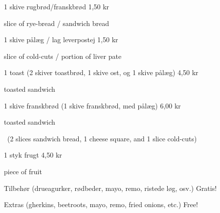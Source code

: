 \documentclass{article}
\begin{document}

\maketitle

\null
\vspace{-0.8cm}


\vspace{0.5cm}

1 skive rugbrød/franskbrød \hfill 1,50 kr

{ slice of rye-bread / sandwich bread}

\vspace{0.3cm}

1 skive pålæg / lag leverpostej \hfill 1,50 kr

{ slice of cold-cuts / portion of liver pate}

\vspace{0.3cm}

1 toast {\large (2 skiver toastbrød, 1 skive ost, og 1 skive pålæg)}
\hfill 4,50 kr

{ toasted sandwich}

\vspace{0.3cm}

1 skive franskbrød {\large (1 skive franskbrød, med pålæg)}
\hfill 6,00 kr

{ toasted sandwich}

\vspace{-0.1cm}

{\english\large\quad\ (2 slices sandwich bread, 1 cheese square, and 1 slice
cold-cuts)}

\vspace{0.3cm}

1 styk frugt
\hfill 4,50 kr

{ piece of fruit}

\vspace{0.3cm}

Tilbehør {\large (drueagurker, rødbeder, mayo, remo, ristede løg, osv.)}
\hfill Gratis!

{\english Extras \large (gherkins, beetroots, mayo, remo, fried onions, etc.)}
\hfill  {\english Free!}

% 
% 
% 
% 
% 
% 
% 
% 
% 
% 
% 
% 
% 
% 
% 
% 
\end{document}
